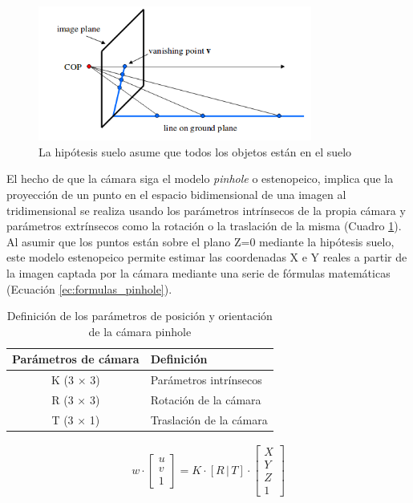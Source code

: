 \begin{figure} [H]
    \begin{center}
      \includegraphics[width=9cm]{figs/Hipotesis suelo.png}
    \end{center}
    \caption{La hipótesis suelo asume que todos los objetos están en el suelo}
    \label{fig:HS}
\end{figure}

El hecho de que la cámara siga el modelo \textit{pinhole} o estenopeico, implica que la proyección de un punto en el espacio bidimensional de una imagen al tridimensional se realiza usando los parámetros intrínsecos de la propia cámara y parámetros extrínsecos como la rotación o la traslación de la misma (Cuadro \ref{tab:parametros_camara}). Al asumir que los puntos están sobre el plano Z=0 mediante la hipótesis suelo, este modelo estenopeico permite estimar las coordenadas X e Y reales a partir de la imagen captada por la cámara mediante una serie de fórmulas matemáticas (Ecuación \ref{ec:formulas_pinhole}).

 \begin{table}[H]
    \centering
    \begin{tabular}{cl}
      \toprule
      \textbf{Parámetros de cámara} & \textbf{Definición} \\
      \midrule
       K (3 × 3)   & Parámetros intrínsecos \\
       R (3 × 3)   & Rotación de la cámara \\
       T (3 × 1)   & Traslación de la cámara \\
      \bottomrule
    \end{tabular}
    \caption{Definición de los parámetros de posición y orientación de la cámara pinhole}
    \label{tab:parametros_camara}
  \end{table}
  
  \begin{myequation}[H]
    \begin{align} 
       w \cdot \begin{bmatrix} u \\ v \\ 1 \end{bmatrix}
       =
       K \cdot [R \,| \, T] \cdot \begin{bmatrix} X \\ Y \\ Z \\ 1 
    \end{bmatrix}
    \nonumber
    \end{align}
    \caption{Relación de fórmulas del modelo de cámara estenopeico}
    \label{ec:formulas_pinhole}
  \end{myequation}

